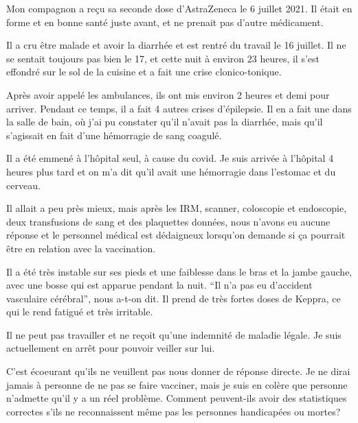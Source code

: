 Mon compagnon a reçu sa seconde dose d'AstraZeneca le 6 juillet 2021. Il était
en forme et en bonne santé juste avant, et ne prenait pas d'autre médicament.

Il a cru être malade et avoir la diarrhée et est rentré du travail le 16
juillet. Il ne se sentait toujours pas bien le 17, et cette nuit à environ 23
heures, il s'est effondré sur le sol de la cuisine et a fait une crise
clonico-tonique.

Après avoir appelé les ambulances, ils ont mis environ 2 heures et demi pour
arriver. Pendant ce temps, il a fait 4 autres crises d'épilepsie. Il en a fait
une dans la salle de bain, où j'ai pu constater qu'il n'avait pas la diarrhée,
mais qu'il s'agissait en fait d'une hémorragie de sang coagulé.

Il a été emmené à l'hôpital seul, à cause du covid. Je suis arrivée à l'hôpital
4 heures plus tard et on m'a dit qu'il avait une hémorragie dans l'estomac et du
cerveau.

Il allait a peu près mieux, mais après les IRM, scanner, coloscopie et
endoscopie, deux transfusions de sang et des plaquettes données, nous n'avons eu
aucune réponse et le personnel médical est dédaigneux lorsqu'on demande si ça
pourrait être en relation avec la vaccination.

Il a été très instable sur ses pieds et une faiblesse dans le bras et la jambe
gauche, avec une bosse qui est apparue pendant la nuit. “Il n'a pas eu
d'accident vasculaire cérébral”, nous a-t-on dit. Il prend de très fortes doses
de Keppra, ce qui le rend fatigué et très irritable.

Il ne peut pas travailler et ne reçoit qu'une indemnité de maladie légale. Je
suis actuellement en arrêt pour pouvoir veiller sur lui.

C'est écoeurant qu'ils ne veuillent pas nous donner de réponse directe. Je ne
dirai jamais à personne de ne pas se faire vacciner, mais je suis en colère que
personne n'admette qu'il y a un réel problème. Comment peuvent-ils avoir des
statistiques correctes s'ils ne reconnaissent même pas les personnes handicapées
ou mortes?

